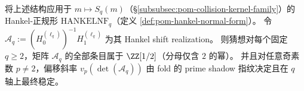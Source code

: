 \begin{conjecture}\label{conj:pom-fold-collision-hankel-nf-dyadic-denominator}
将上述结构应用于 \(m\mapsto S_q(m)\)（\S\ref{subsubsec:pom-collision-kernel-family}）的 Hankel-正规形 \(\mathrm{HANKELNF}_q\)（定义 \ref{def:pom-hankel-normal-form}）。
令
\(
\mathcal A_q:=(H_0^{(\ell_q)})^{-1}H_1^{(\ell_q)}
\)
为其 Hankel shift realization。
则猜想对每个固定 \(q\ge 2\)，矩阵 \(\mathcal A_q\) 的全部条目属于 \(\ZZ[1/2]\)（分母仅含 \(2\) 的幂）。
并且对任意奇素数 \(p\neq 2\)，偏移斜率 \(v_p(\det(\mathcal A_q))\) 由 fold 的 prime shadow 指纹决定且在 \(q\) 轴上最终稳定。
\end{conjecture}

\endinput
